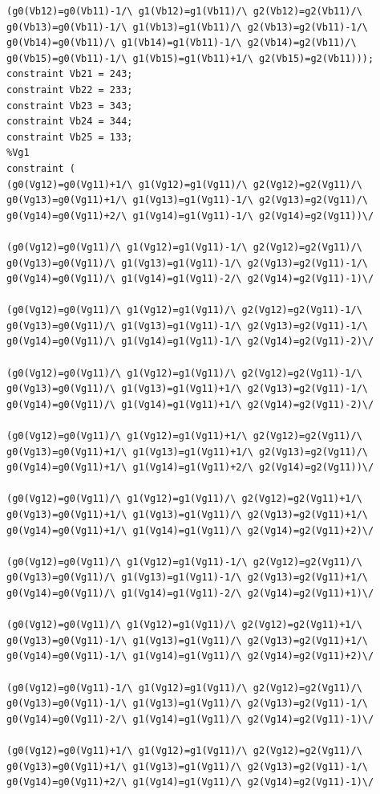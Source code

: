 \begin{appendices}
\begin{lstlisting}
(g0(Vb12)=g0(Vb11)-1/\ g1(Vb12)=g1(Vb11)/\ g2(Vb12)=g2(Vb11)/\ g0(Vb13)=g0(Vb11)-1/\ g1(Vb13)=g1(Vb11)/\ g2(Vb13)=g2(Vb11)-1/\ g0(Vb14)=g0(Vb11)/\ g1(Vb14)=g1(Vb11)-1/\ g2(Vb14)=g2(Vb11)/\ g0(Vb15)=g0(Vb11)-1/\ g1(Vb15)=g1(Vb11)+1/\ g2(Vb15)=g2(Vb11)));
constraint Vb21 = 243;
constraint Vb22 = 233;
constraint Vb23 = 343;
constraint Vb24 = 344;
constraint Vb25 = 133;
%Vg1
constraint (
(g0(Vg12)=g0(Vg11)+1/\ g1(Vg12)=g1(Vg11)/\ g2(Vg12)=g2(Vg11)/\ g0(Vg13)=g0(Vg11)+1/\ g1(Vg13)=g1(Vg11)-1/\ g2(Vg13)=g2(Vg11)/\ g0(Vg14)=g0(Vg11)+2/\ g1(Vg14)=g1(Vg11)-1/\ g2(Vg14)=g2(Vg11))\/ 

(g0(Vg12)=g0(Vg11)/\ g1(Vg12)=g1(Vg11)-1/\ g2(Vg12)=g2(Vg11)/\ g0(Vg13)=g0(Vg11)/\ g1(Vg13)=g1(Vg11)-1/\ g2(Vg13)=g2(Vg11)-1/\ g0(Vg14)=g0(Vg11)/\ g1(Vg14)=g1(Vg11)-2/\ g2(Vg14)=g2(Vg11)-1)\/ 

(g0(Vg12)=g0(Vg11)/\ g1(Vg12)=g1(Vg11)/\ g2(Vg12)=g2(Vg11)-1/\ g0(Vg13)=g0(Vg11)/\ g1(Vg13)=g1(Vg11)-1/\ g2(Vg13)=g2(Vg11)-1/\ g0(Vg14)=g0(Vg11)/\ g1(Vg14)=g1(Vg11)-1/\ g2(Vg14)=g2(Vg11)-2)\/ 

(g0(Vg12)=g0(Vg11)/\ g1(Vg12)=g1(Vg11)/\ g2(Vg12)=g2(Vg11)-1/\ g0(Vg13)=g0(Vg11)/\ g1(Vg13)=g1(Vg11)+1/\ g2(Vg13)=g2(Vg11)-1/\ g0(Vg14)=g0(Vg11)/\ g1(Vg14)=g1(Vg11)+1/\ g2(Vg14)=g2(Vg11)-2)\/ 

(g0(Vg12)=g0(Vg11)/\ g1(Vg12)=g1(Vg11)+1/\ g2(Vg12)=g2(Vg11)/\ g0(Vg13)=g0(Vg11)+1/\ g1(Vg13)=g1(Vg11)+1/\ g2(Vg13)=g2(Vg11)/\ g0(Vg14)=g0(Vg11)+1/\ g1(Vg14)=g1(Vg11)+2/\ g2(Vg14)=g2(Vg11))\/ 

(g0(Vg12)=g0(Vg11)/\ g1(Vg12)=g1(Vg11)/\ g2(Vg12)=g2(Vg11)+1/\ g0(Vg13)=g0(Vg11)+1/\ g1(Vg13)=g1(Vg11)/\ g2(Vg13)=g2(Vg11)+1/\ g0(Vg14)=g0(Vg11)+1/\ g1(Vg14)=g1(Vg11)/\ g2(Vg14)=g2(Vg11)+2)\/ 

(g0(Vg12)=g0(Vg11)/\ g1(Vg12)=g1(Vg11)-1/\ g2(Vg12)=g2(Vg11)/\ g0(Vg13)=g0(Vg11)/\ g1(Vg13)=g1(Vg11)-1/\ g2(Vg13)=g2(Vg11)+1/\ g0(Vg14)=g0(Vg11)/\ g1(Vg14)=g1(Vg11)-2/\ g2(Vg14)=g2(Vg11)+1)\/ 

(g0(Vg12)=g0(Vg11)/\ g1(Vg12)=g1(Vg11)/\ g2(Vg12)=g2(Vg11)+1/\ g0(Vg13)=g0(Vg11)-1/\ g1(Vg13)=g1(Vg11)/\ g2(Vg13)=g2(Vg11)+1/\ g0(Vg14)=g0(Vg11)-1/\ g1(Vg14)=g1(Vg11)/\ g2(Vg14)=g2(Vg11)+2)\/ 

(g0(Vg12)=g0(Vg11)-1/\ g1(Vg12)=g1(Vg11)/\ g2(Vg12)=g2(Vg11)/\ g0(Vg13)=g0(Vg11)-1/\ g1(Vg13)=g1(Vg11)/\ g2(Vg13)=g2(Vg11)-1/\ g0(Vg14)=g0(Vg11)-2/\ g1(Vg14)=g1(Vg11)/\ g2(Vg14)=g2(Vg11)-1)\/ 

(g0(Vg12)=g0(Vg11)+1/\ g1(Vg12)=g1(Vg11)/\ g2(Vg12)=g2(Vg11)/\ g0(Vg13)=g0(Vg11)+1/\ g1(Vg13)=g1(Vg11)/\ g2(Vg13)=g2(Vg11)-1/\ g0(Vg14)=g0(Vg11)+2/\ g1(Vg14)=g1(Vg11)/\ g2(Vg14)=g2(Vg11)-1)\/ 


\end{lstlisting}
\end{appendices}
